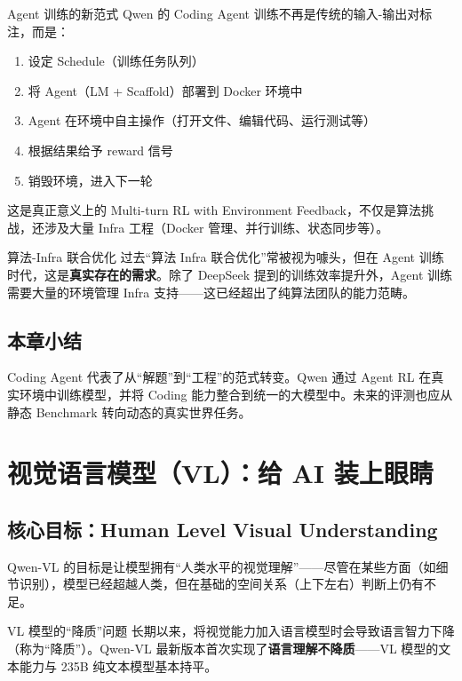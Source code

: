 \documentclass[a4paper]{article}
\begin{document}
\begin{importantbox}{Agent 训练的新范式}
Qwen 的 Coding Agent 训练不再是传统的输入-输出对标注，而是：
\begin{enumerate}
    \item 设定 Schedule（训练任务队列）
    \item 将 Agent（LM + Scaffold）部署到 Docker 环境中
    \item Agent 在环境中自主操作（打开文件、编辑代码、运行测试等）
    \item 根据结果给予 reward 信号
    \item 销毁环境，进入下一轮
\end{enumerate}
这是真正意义上的 Multi-turn RL with Environment Feedback，不仅是算法挑战，还涉及大量 Infra 工程（Docker 管理、并行训练、状态同步等）。
\end{importantbox}

\begin{knowledgebox}{算法-Infra 联合优化}
过去``算法 Infra 联合优化''常被视为噱头，但在 Agent 训练时代，这是\textbf{真实存在的需求}。除了 DeepSeek 提到的训练效率提升外，Agent 训练需要大量的环境管理 Infra 支持——这已经超出了纯算法团队的能力范畴。
\end{knowledgebox}

\subsection{本章小结}

Coding Agent 代表了从``解题''到``工程''的范式转变。Qwen 通过 Agent RL 在真实环境中训练模型，并将 Coding 能力整合到统一的大模型中。未来的评测也应从静态 Benchmark 转向动态的真实世界任务。

\section{视觉语言模型（VL）：给 AI 装上眼睛}

\subsection{核心目标：Human Level Visual Understanding}

Qwen-VL 的目标是让模型拥有``人类水平的视觉理解''——尽管在某些方面（如细节识别），模型已经超越人类，但在基础的空间关系（上下左右）判断上仍有不足。

\begin{warningbox}{VL 模型的``降质''问题}
长期以来，将视觉能力加入语言模型时会导致语言智力下降（称为``降质''）。Qwen-VL 最新版本首次实现了\textbf{语言理解不降质}——VL 模型的文本能力与 235B 纯文本模型基本持平。
\end{warningbox}
\end{document}
